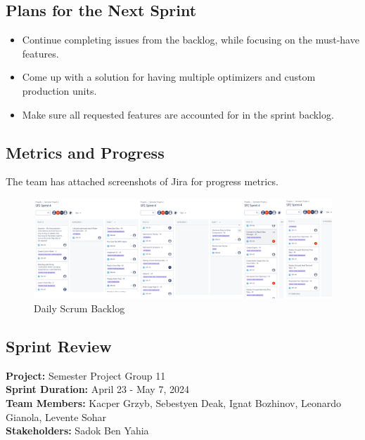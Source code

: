 \documentclass[12pt]{report}
\begin{document}
\subsection*{Plans for the Next Sprint}
\begin{itemize}
    \item Continue completing issues from the backlog, while focusing on the must-have features.
    \item Come up with a solution for having multiple optimizers and custom production units.
    \item Make sure all requested features are accounted for in the sprint backlog.
\end{itemize}

\subsection*{Metrics and Progress}
The team has attached screenshots of Jira for progress metrics.

\begin{figure}[H]
  \centering
  \includegraphics[width=1\textwidth]{Resources/4-Sprint/Daily-Scrum/Backlog.png}
  \caption{Daily Scrum Backlog}
  \label{fig:S4Scrum-image}
\end{figure}
\clearpage

\subsection*{Sprint Review}
\textbf{Project:} Semester Project Group 11 \\
\textbf{Sprint Duration:} April 23 - May 7, 2024 \\
\textbf{Team Members:} Kacper Grzyb, Sebestyen Deak, Ignat Bozhinov, Leonardo Gianola, Levente Sohar \\
\textbf{Stakeholders:} Sadok Ben Yahia
\end{document}
